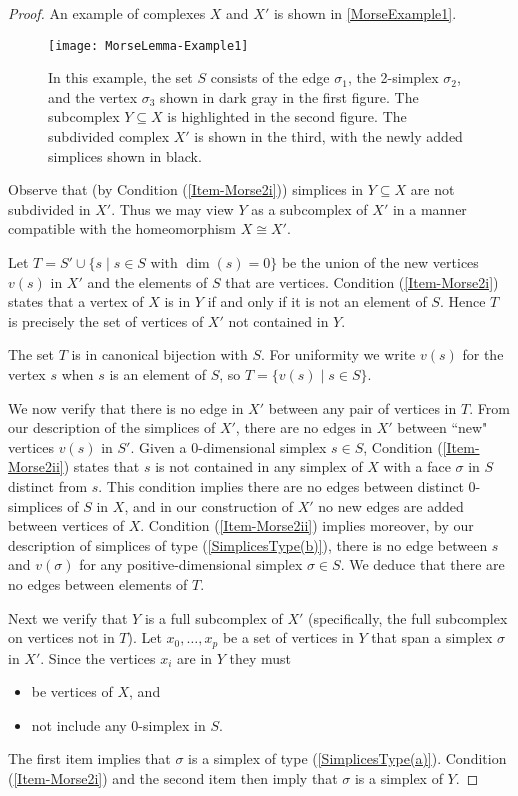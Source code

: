 \documentclass[a4paper]{amsart}
\numberwithin{theoremcounter}{section}
\theoremstyle{definition}
\theoremstyle{remark}
\begin{document}
\begin{proof}
 An example of complexes $X$ and $X'$ is shown in \autoref{MorseExample1}. 

\begin{figure}[h!]
\texttt{[image: MorseLemma-Example1]} 
\caption{In this example, the set $S$ consists of the edge $\sigma_1$, the 2-simplex $\sigma_2$, and the vertex $\sigma_3$ shown in dark gray in the first figure. The subcomplex $Y \subseteq X$ is highlighted in the second figure. The subdivided complex $X'$ is shown in the third, with the newly added simplices shown in black.} 
\label{MorseExample1}
\end{figure} 




Observe that (by Condition (\ref{Item-Morse2i})) simplices in $Y \subseteq X$ are not subdivided in $X'$. Thus we may view $Y$ as a subcomplex of $X'$ in a manner compatible with the homeomorphism $X \cong X'$. 

Let $T = S' \cup \{s  \mid   s \in S \text{ with $\dim(s)=0$}\}$ be the union of the new vertices $v(s)$ in $X'$ and the elements of $S$ that are vertices.  Condition (\ref{Item-Morse2i}) states that a vertex of $X$ is in $Y$ if and only if it is not an element of $S$. Hence $T$ is precisely the set of vertices of $X'$ not contained in $Y$. 

The set $T$ is in canonical bijection with $S$. For uniformity we write $v(s)$ for the vertex $s$ when $s$ is an element of $S$, so $T=\{v(s) \mid   s \in S\}$. 


We now verify that  there is no edge in $X'$ between any pair of vertices in $T$. From our description of the simplices of $X'$, there are no edges in $X'$ between ``new" vertices $v(s)$ in $S'$. Given a $0$-dimensional simplex $s \in S$, Condition (\ref{Item-Morse2ii})  states that $s$ is not contained in any simplex of $X$ with a face $\sigma$ in $S$ distinct from $s$. This condition implies there are no edges between distinct $0$-simplices of $S$ in $X$, and in our construction of $X'$ no new edges are added between vertices of $X$. Condition (\ref{Item-Morse2ii})  implies moreover, by our description of simplices of type (\ref{SimplicesType(b)}),  there is no edge between $s$ and $v(\sigma)$ for any positive-dimensional simplex $\sigma \in S$. We deduce that there are no edges between elements of $T$. 

Next we verify that $Y$ is a full subcomplex of $X'$ (specifically, the full subcomplex on vertices not in $T$). Let $x_0, \dots, x_p$ be a set of vertices in $Y$ that span a simplex $\sigma$ in $X'$. Since the vertices $x_i$ are in $Y$ they must 
\begin{itemize}
\item be vertices of $X$, and
\item not include any 0-simplex in $S$. 
\end{itemize} 
The first item implies that $\sigma$ is a simplex of type (\ref{SimplicesType(a)}). Condition (\ref{Item-Morse2i})  and the second item then imply that $\sigma$  is a simplex of $Y$. 



\end{proof}
\end{document}
